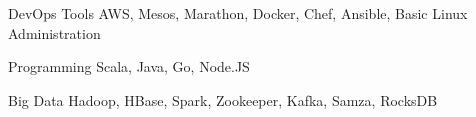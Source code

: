 

\begin{cvskills}

  \cvskill
    {DevOps Tools} %
    {AWS, Mesos, Marathon, Docker, Chef, Ansible, Basic Linux Administration} %

  \cvskill
    {Programming} %
    {Scala, Java, Go, Node.JS} %

  \cvskill
    {Big Data} %
    {Hadoop, HBase, Spark, Zookeeper, Kafka, Samza, RocksDB} %

\end{cvskills}
